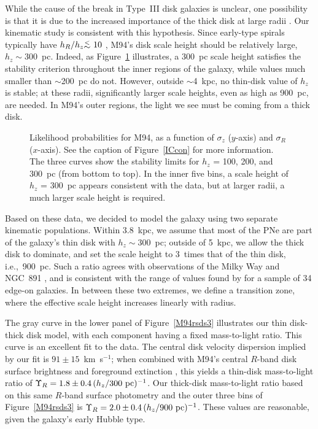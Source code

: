 \documentclass[12pt,preprint]{emulateapj}
\newcommand{\ie}{{i.e.,}}
\newcommand{\kms}{km~s$^{-1}$}
\newcommand{\simlt}{{\raise-.5ex\hbox{$\buildrel<\over\sim$}}\ }
\begin{document}
While the cause of the break in Type~III disk galaxies is unclear, one possibility is that it is due to the increased importance of the thick disk at large radii \citep{yd06, p+07}.  Our kinematic study is consistent with this hypothesis.  Since early-type spirals typically have $h_R / h_z \simlt 10$ \citep{bm02, dG98, kvd02}, M94's disk scale height should be relatively large, $h_z \sim 300$~pc. Indeed, as Figure~\ref{M94con} illustrates, a 300~pc scale height satisfies the \citet{t64} stability criterion throughout the inner regions of the galaxy, while values much smaller than $\sim$200~pc do not.  However, outside $\sim$4~kpc, no thin-disk value of $h_z$ is stable; at these radii, significantly larger scale heights, even as high as 900~pc, are needed.  In M94's outer regions, the light we see must be coming from a thick disk.   

\begin{figure}[b]
\caption{\scriptsize Likelihood probabilities for M94, as a function of $\sigma_z$ ($y$-axis) and $\sigma_R$ ($x$-axis).  See the caption of Figure~\ref{ICcon} for more information.  The three curves show the stability limits for $h_z$ = 100, 200, and 300~pc (from bottom to top).  In the inner five bins, a scale height of $h_z$ = 300~pc appears consistent with the data, but at larger radii, a much larger scale height is required. \label{M94con} }
\end{figure}

Based on these data, we decided to model the galaxy using two separate kinematic populations.  Within 3.8~kpc, we assume that most of the PNe are part of the galaxy's thin disk with $h_z \sim 300$~pc; outside of 5~kpc, we allow the thick disk to dominate, and set the scale height to 3~times that of the thin disk, \ie\ 900~pc.  Such a ratio agrees with observations of the Milky Way \citep{lh03} and NGC~891 \citep{m+97}, and is consistent with the range of values found by \citet{yd06} for a sample of 34 edge-on galaxies.  In between these two extremes, we define a transition zone, where the effective scale height increases linearly with radius.

The gray curve in the lower panel of Figure~\ref{M94rsds3} illustrates our thin disk-thick disk model, with each component having a fixed mass-to-light ratio.   This curve is an excellent fit to the data.  The central disk velocity dispersion implied by our fit is $91 \pm 15$~\kms; when combined with M94's central $R$-band disk surface brightness \citep[$\mu_R(0) = 18.88 \pm 0.05$;][]{g+09} and foreground extinction \citep[$E(B-V) = 0.018$;][]{sfd98}, this yields a thin-disk mass-to-light ratio of $\Upsilon_{R} = 1.8 \pm 0.4 \, (h_z / 300~{\rm pc})^{-1}$.  Our thick-disk mass-to-light ratio based on this same $R$-band surface photometry and the outer three bins of Figure~\ref{M94rsds3} is $\Upsilon_{R} = 2.0 \pm 0.4 \, (h_z / 900~{\rm pc})^{-1}$.  These values are reasonable, given the galaxy's early Hubble type.
\end{document}
